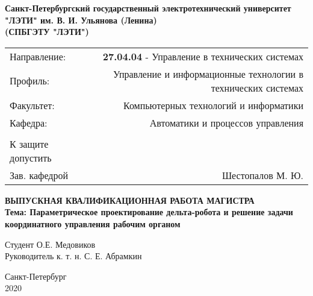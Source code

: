 \begin{center}
\hfill \break
\small{\textbf{Санкт-Петербургский государственный электротехнический университет}}\\
\small{\textbf{"ЛЭТИ" им. В. И. Ульянова (Ленина)}}\\
\small{\textbf{(СПБГЭТУ "ЛЭТИ")}}\\
\hfill \break

\begin{center}
\begin{tabular}{lr}
Направление: & \textbf{27.04.04} - Управление в технических системах \\
Профиль: &  Управление и информационные технологии в технических системах \\
Факультет: & Компьютерных технологий и информатики \\
Кафедра: & Автоматики и процессов управления \\
\\
К защите допустить & \\
Зав. кафедрой &  Шестопалов М. Ю.
\end{tabular}
\end{center}

\normalsize{}
\vspace{3cm}
\large{\textbf{ВЫПУСКНАЯ КВАЛИФИКАЦИОННАЯ РАБОТА МАГИСТРА}}\\
\vspace{1cm}
\normalsize{\textbf{Тема: Параметрическое проектирование дельта-робота и решение задачи координатного управления рабочим органом}}\\
\vspace{3cm}
 
\begin{flushleft}
 \hspace{1cm} Студент \hspace{7cm} \underline{\hspace{3cm}}  О.Е. Медовиков \\ 
 \vspace{5mm}
 \hspace{1cm} Руководитель \hspace{2cm} к. т. н. \hspace{2cm} \underline{\hspace{3cm}}  С. Е. Абрамкин\\ 
\end{flushleft}

\vspace{4cm}
Санкт-Петербург \\ 2020 
\end{center}
\thispagestyle{empty} %
 

